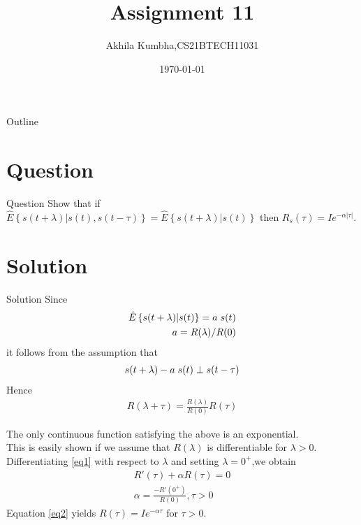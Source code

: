 \documentclass{beamer}
\title{Assignment 11}
\author{Akhila Kumbha,CS21BTECH11031}
\date{\today}
\providecommand{\cbrak}[1]{\ensuremath{\left\{#1\right\}}}
\begin{document}
\begin{frame}
    \titlepage 
\end{frame}

\logo{}

\begin{frame}{Outline}
    \tableofcontents
\end{frame}


\section{Question}
\begin{frame}{Question}
Show that if\\ $\hat{E}\cbrak{s(t+\lambda)|s(t),s(t-\tau)}=\hat{E}\cbrak{s(t+\lambda)|s(t)}$ then $R_s(\tau)=Ie^{-\alpha|\tau|}$.\\
\end{frame}


\section{Solution}
\begin{frame}{Solution}
Since 
\begin{align}
    \hat{E}\cbrak{s(t+\lambda)|s(t)}=a\hspace{1mm}s(t)\\
     a=R(\lambda)/R(0)
\end{align}
it follows from the assumption that 
\begin{align}
    s(t+\lambda)-a\hspace{1mm}s(t)\perp s(t-\tau)
\end{align}
Hence
\begin{align}
    R(\lambda +\tau)=\frac{R(\lambda)}{R(0)} R(\tau)\label{eq1}
\end{align}
\end{frame} 

\begin{frame}
The only continuous function satisfying the above is an exponential.\\This is easily shown if we assume that $R(\lambda)$ is differentiable for $\lambda>0$.\\
Differentiating \eqref{eq1} with respect to $\lambda$ and setting $\lambda=0
^{+}$,we obtain 
\begin{align}
    R'(\tau)+\alpha R(\tau)=0\label{eq2}\\
    \alpha=\frac{-R'(0^+)}{R(0)},\tau>0
\end{align}
Equation \eqref{eq2} yields $R(\tau)=Ie^{-\alpha\tau}$ for $\tau>0$.

\end{frame}
\end{document}
